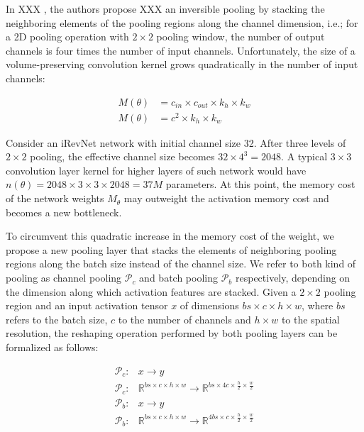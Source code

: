 \documentclass[twocolumn]{bmcart}
\begin{document}
In XXX \etal, the authors propose XXX an inversible pooling by stacking the neighboring elements of the pooling regions along the channel dimension, i.e.; for a 2D pooling operation with $2 \times 2$ pooling window, the number of output channels is four times the number of input channels. Unfortunately, the size of a volume-preserving convolution kernel grows quadratically in the number of input channels:

\begin{subequations}
\begin{align}
M(\theta) &= c_{in} \times c_{out} \times k_h \times k_w \\
M(\theta) &= c^2 \times k_h \times k_w
\end{align}
\end{subequations}

Consider an iRevNet network with initial channel size 32.
After three levels of $2 \times 2$ pooling, the effective channel size becomes $32 \times 4^3=2048$. A typical $3 \times 3$ convolution layer kernel for higher layers of such network would have $n(\theta)=2048 \times 3 \times 3 \times 2048=37M$ parameters.
At this point, the memory cost of the network weights $M_{\theta}$ may outweight the activation memory cost and becomes a new bottleneck.

To circumvent this quadratic increase in the memory cost of the weight, we propose a new pooling layer that stacks the elements of neighboring pooling regions along the batch size instead of the channel size. We refer to both kind of pooling as channel pooling $\mathcal{P}_c$ and batch pooling $\mathcal{P}_b$ respectively, depending on the dimension along which activation features are stacked.
Given a $2 \times 2$ pooling region and an input activation tensor $x$ of dimensions $bs \times c \times h \times w$, where $bs$ refers to the batch size, $c$ to the number of channels and $h \times w$ to the spatial resolution, the reshaping operation performed by both pooling layers can be formalized as follows:

\begin{subequations}
\begin{align}
	\mathcal{P}_c :& x \rightarrow y \\
	\mathcal{P}_c :& \mathbb{R}^{bs \times c \times h \times w}  \rightarrow \mathbb{R}^{bs \times 4c \times \frac{h}{2} \times \frac{w}{2}}\\
	\mathcal{P}_b :& x \rightarrow y \\
    \mathcal{P}_b :&  \mathbb{R}^{bs \times c \times h \times w}  \rightarrow \mathbb{R}^{4bs \times c \times \frac{h}{2} \times \frac{w}{2}}
\end{align}
\end{subequations}
\end{document}
